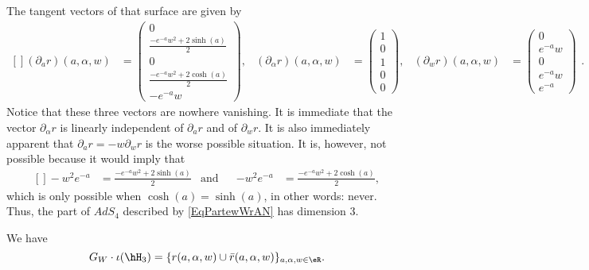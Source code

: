 	The tangent vectors of that surface are given by
	\begin{equation}
		\begin{aligned}[]
			(\partial_ar)(a,\alpha,w)        & =
			\begin{pmatrix}
				0                                 \\
				\frac{ - e^{-a}w^2+2\sinh(a) }{2} \\
				0                                 \\
				\frac{ - e^{-a}w^2+2\cosh(a) }{2} \\
				- e^{-a}w
			\end{pmatrix}
			,                                &
			(\partial_{\alpha}r)(a,\alpha,w) & =
			\begin{pmatrix}
				1 \\
				0 \\
				1 \\
				0 \\
				0
			\end{pmatrix}
			,                                &
			(\partial_wr)(a,\alpha,w)        & =
			\begin{pmatrix}
				0       \\
				e^{-a}w \\
				0       \\
				e^{-a}w \\
				e^{-a}
			\end{pmatrix}
		\end{aligned}.
	\end{equation}
	Notice that these three vectors are nowhere vanishing. It is immediate that the vector $\partial_{\alpha}r$ is linearly independent of $\partial_{a}r$ and of $\partial_wr$. It is also immediately apparent that $\partial_ar=-w\partial_wr$ is the worse possible situation. It is, however, not possible because it would imply that
	\begin{equation}
		\begin{aligned}[]
			-w^2 e^{-a} & =\frac{ - e^{-a}w^2+2\sinh(a) }{2} & \text{and} &  & -w^2 e^{-a} & =\frac{ - e^{-a}w^2+2\cosh(a) }{2},
		\end{aligned}
	\end{equation}
	which is only possible when $\cosh(a)=\sinh(a)$, in other words: never. Thus, the part of $AdS_4$ described by \eqref{EqPartewWrAN} has dimension $3$.


	\begin{proposition}
		We have
		\begin{equation}
			G_W\cdot\iota(\hH_3)=
			\{ r(a,\alpha,w)\cup\bar r(a,\alpha,w) \}_{a,\alpha,w\in\eR}.
		\end{equation}
	\end{proposition}

